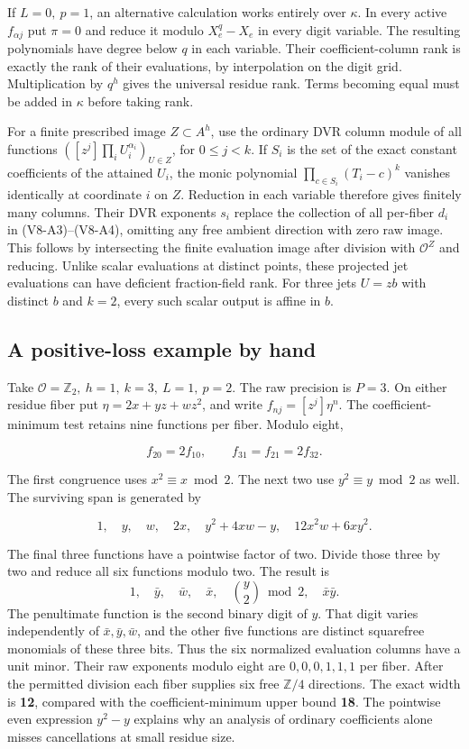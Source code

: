 \documentclass[11pt,a4paper]{article}
\begin{document}
If \(L=0,\ p=1\), an alternative calculation works entirely over
\(\kappa\). In every active \(f_{\alpha j}\) put \(\pi=0\) and reduce it
modulo \(X_e^q-X_e\) in every digit variable. The resulting polynomials
have degree below \(q\) in each variable. Their coefficient-column rank
is exactly the rank of their evaluations, by interpolation on the digit
grid. Multiplication by \(q^h\) gives the universal residue rank. Terms
becoming equal must be added in \(\kappa\) before taking rank.

For a finite prescribed image \(Z\subset A^h\), use the ordinary DVR
column module of all functions
\(([z^j]\prod_i U_i^{\alpha_i})_{U\in Z}\), for \(0\le j<k\). If \(S_i\)
is the set of the exact constant coefficients of the attained \(U_i\),
the monic polynomial \(\prod_{c\in S_i}(T_i-c)^k\) vanishes identically
at coordinate \(i\) on \(Z\). Reduction in each variable therefore gives
finitely many columns. Their DVR exponents \(s_i\) replace the
collection of all per-fiber \(d_i\) in (V8-A3)--(V8-A4), omitting any free
ambient direction with zero raw image. This follows by intersecting the
finite evaluation image after division with \(\mathcal O^Z\) and
reducing. Unlike scalar evaluations at distinct points, these projected
jet evaluations can have deficient fraction-field rank. For three jets
\(U=zb\) with distinct \(b\) and \(k=2\), every such scalar output is
affine in \(b\).

\subsection{A positive-loss example by
hand}\label{v8-a-positive-loss-example-by-hand}

Take \(\mathcal O=\mathbb Z_2,\ h=1,\ k=3,\ L=1,\ p=2\). The raw
precision is \(P=3\). On either residue fiber put \(\eta=2x+yz+wz^2\),
and write \(f_{nj}=[z^j]\eta^n\). The coefficient-minimum test retains
nine functions per fiber. Modulo eight,

\[
 f_{20}=2f_{10},\qquad f_{31}=f_{21}=2f_{32}.
\]

The first congruence uses \(x^2\equiv x\bmod2\). The next two use
\(y^2\equiv y\bmod2\) as well. The surviving span is generated by

\[
        1,\quad y,\quad w,\quad 2x,\quad
        y^2+4xw-y,\quad 12x^2w+6xy^2 .
\]

The final three functions have a pointwise factor of two. Divide those
three by two and reduce all six functions modulo two. The result is \[
       1,\quad \bar y,\quad\bar w,\quad\bar x,\quad
       \binom{y}{2}\bmod2,\quad\bar x\bar y .
\] The penultimate function is the second binary digit of \(y\). That
digit varies independently of \(\bar x,\bar y,\bar w\), and the other
five functions are distinct squarefree monomials of these three bits.
Thus the six normalized evaluation columns have a unit minor. Their raw
exponents modulo eight are \(0,0,0,1,1,1\) per fiber. After the
permitted division each fiber supplies six free \(\mathbb Z/4\)
directions. The exact width is \textbf{12}, compared with the
coefficient-minimum upper bound \textbf{18}. The pointwise even
expression \(y^2-y\) explains why an analysis of ordinary coefficients
alone misses cancellations at small residue size.
\end{document}
